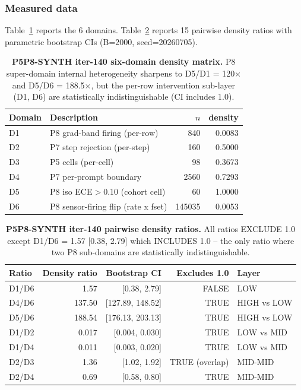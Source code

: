 \subsubsection{Measured data}
Table~\ref{tab:p5p8synth-iter140-six-domain} reports the 6 domains.
Table~\ref{tab:p5p8synth-iter140-ratios} reports 15 pairwise density
ratios with parametric bootstrap CIs (B=2000, seed=20260705).

\begin{table}[h]
\centering
\caption{\textbf{P5P8-SYNTH iter-140 six-domain density matrix.}
P8 super-domain internal heterogeneity sharpens to
D5/D1 = 120$\times$ and D5/D6 = 188.5$\times$, but the per-row
intervention sub-layer (D1, D6) are statistically indistinguishable
(CI includes 1.0).}
\label{tab:p5p8synth-iter140-six-domain}
\small
\begin{tabular}{llrr}
\toprule
Domain & Description & $n$ & density \\
\midrule
D1 & P8 grad-band firing (per-row) & 840 & 0.0083 \\
D2 & P7 step rejection (per-step)  & 160 & 0.5000 \\
D3 & P5 cells (per-cell)           & 98  & 0.3673 \\
D4 & P7 per-prompt boundary        & 2560 & 0.7293 \\
D5 & P8 iso ECE$>$0.10 (cohort cell) & 60 & 1.0000 \\
D6 & P8 sensor-firing flip (rate x fset) & 145035 & 0.0053 \\
\bottomrule
\end{tabular}
\end{table}

\begin{table}[h]
\centering
\caption{\textbf{P5P8-SYNTH iter-140 pairwise density ratios.}
All ratios EXCLUDE 1.0 except D1/D6 = 1.57 [0.38, 2.79]
which INCLUDES 1.0 -- the only ratio where two P8 sub-domains
are statistically indistinguishable.}
\label{tab:p5p8synth-iter140-ratios}
\small
\begin{tabular}{lrrrl}
\toprule
Ratio & Density ratio & Bootstrap CI & Excludes 1.0 & Layer \\
\midrule
D1/D6 & 1.57   & [0.38, 2.79]   & FALSE  & LOW \\
D4/D6 & 137.50 & [127.89, 148.52] & TRUE   & HIGH vs LOW \\
D5/D6 & 188.54 & [176.13, 203.13] & TRUE   & HIGH vs LOW \\
D1/D2 & 0.017  & [0.004, 0.030]  & TRUE   & LOW vs MID \\
D1/D4 & 0.011  & [0.003, 0.020]  & TRUE   & LOW vs MID \\
D2/D3 & 1.36   & [1.02, 1.92]    & TRUE (overlap) & MID-MID \\
D2/D4 & 0.69   & [0.58, 0.80]    & TRUE   & MID-MID \\
\bottomrule
\end{tabular}
\end{table}


